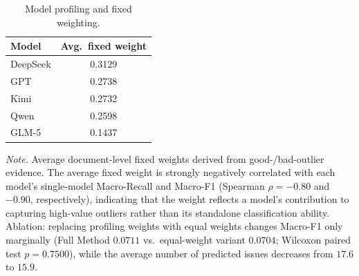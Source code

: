 \begin{table}[!ht]
\centering
\caption{Model profiling and fixed weighting.}
\label{tab:model_profile_weights}
\small
\begin{tabular}{lc}
\toprule
\textbf{Model} & \textbf{Avg.\ fixed weight} \\
\midrule
DeepSeek & 0.3129 \\
GPT      & 0.2738 \\
Kimi     & 0.2732 \\
Qwen     & 0.2598 \\
GLM-5    & 0.1437 \\
\bottomrule
\end{tabular}

\par\vspace{0.4em}
{\footnotesize \textit{Note.} Average document-level fixed weights derived from good-/bad-outlier evidence. The average fixed weight is strongly negatively correlated with each model's single-model Macro-Recall and Macro-F1 (Spearman $\rho=-0.80$ and $-0.90$, respectively), indicating that the weight reflects a model's contribution to capturing high-value outliers rather than its standalone classification ability. Ablation: replacing profiling weights with equal weights changes Macro-F1 only marginally (Full Method $0.0711$ vs.\ equal-weight variant $0.0704$; Wilcoxon paired test $p=0.7500$), while the average number of predicted issues decreases from $17.6$ to $15.9$.\par}
\end{table}
